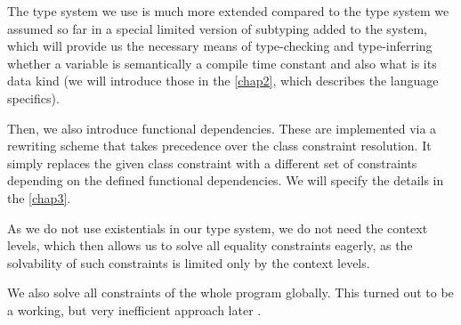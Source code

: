The type system we use is much more extended compared to the type system we assumed so far in a special limited version of subtyping added to the system, which will provide us the necessary means of type-checking and type-inferring whether a variable is semantically a compile time constant and also what is its data kind (we will introduce those in the \cref{chap2}, which describes the language specifics).

Then, we also introduce functional dependencies. These are implemented via a rewriting scheme that takes precedence over the class constraint resolution. It simply replaces the given class constraint with a different set of constraints depending on the defined functional dependencies. We will specify the details in the \cref{chap3}.

As we do not use existentials in our type system, we do not need the context levels, which then allows us to solve all equality constraints eagerly, as the solvability of such constraints is limited only by the context levels.

We also solve all constraints of the whole program globally. This turned out to be a working, but very inefficient approach later .
